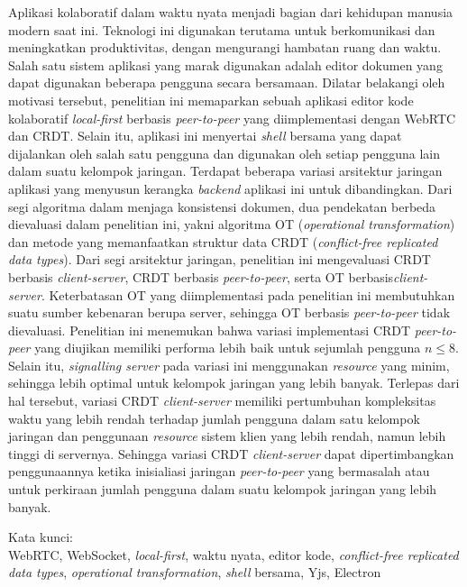 \noindent Aplikasi kolaboratif dalam waktu nyata menjadi bagian dari kehidupan manusia modern saat ini. Teknologi ini digunakan terutama untuk berkomunikasi dan meningkatkan produktivitas, dengan mengurangi hambatan ruang dan waktu. Salah satu sistem aplikasi yang marak digunakan adalah editor dokumen yang dapat digunakan beberapa pengguna secara bersamaan. Dilatar belakangi oleh motivasi tersebut, penelitian ini memaparkan sebuah aplikasi editor kode kolaboratif \textit{local-first} berbasis \textit{peer-to-peer} yang diimplementasi dengan WebRTC dan CRDT. Selain itu, aplikasi ini menyertai \textit{shell} bersama yang dapat dijalankan oleh salah satu pengguna dan digunakan oleh setiap pengguna lain dalam suatu kelompok jaringan. Terdapat beberapa variasi arsitektur jaringan aplikasi yang menyusun kerangka \textit{backend} aplikasi ini untuk dibandingkan. Dari segi algoritma dalam menjaga konsistensi dokumen, dua pendekatan berbeda dievaluasi dalam penelitian ini, yakni algoritma OT (\textit{operational transformation}) dan metode yang memanfaatkan struktur data CRDT (\textit{conflict-free replicated data types}). Dari segi arsitektur jaringan, penelitian ini mengevaluasi CRDT berbasis \textit{client-server}, CRDT berbasis \textit{peer-to-peer}, serta OT berbasis\textit{client-server}. Keterbatasan OT yang diimplementasi pada penelitian ini membutuhkan suatu sumber kebenaran berupa server, sehingga OT berbasis \textit{peer-to-peer} tidak dievaluasi. Penelitian ini menemukan bahwa variasi implementasi CRDT \textit{peer-to-peer} yang diujikan memiliki performa lebih baik untuk sejumlah pengguna $n \leq 8$. Selain itu, \textit{signalling server} pada variasi ini menggunakan \textit{resource} yang minim, sehingga lebih optimal untuk kelompok jaringan yang lebih banyak. Terlepas dari hal tersebut, variasi CRDT \textit{client-server} memiliki pertumbuhan kompleksitas waktu yang lebih rendah terhadap jumlah pengguna dalam satu kelompok jaringan dan penggunaan \textit{resource} sistem klien yang lebih rendah, namun lebih tinggi di servernya. Sehingga variasi CRDT \textit{client-server} dapat dipertimbangkan penggunaannya ketika inisialiasi jaringan \textit{peer-to-peer} yang bermasalah atau untuk perkiraan jumlah pengguna dalam suatu kelompok jaringan yang lebih banyak.\\

\vspace*{0.2cm}

\noindent Kata kunci: \\ WebRTC, WebSocket, \textit{local-first}, waktu nyata, editor kode, \textit{conflict-free replicated data types}, \textit{operational transformation}, \textit{shell} bersama, Yjs, Electron \\

\newpage
